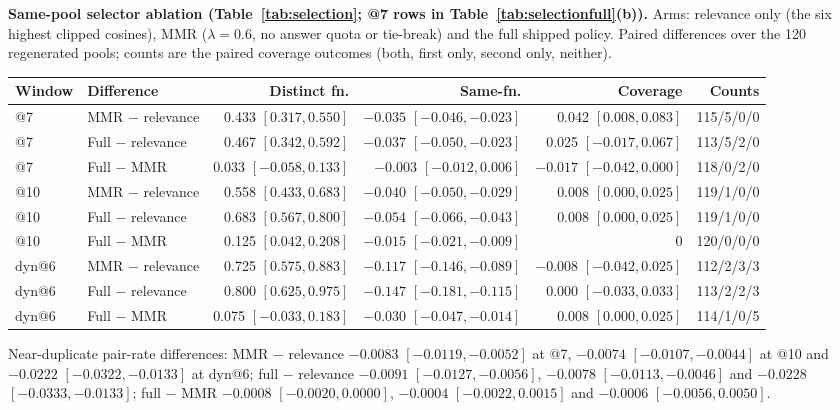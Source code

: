 \textbf{Same-pool selector ablation (Table~\ref{tab:selection}; @7 rows in Table~\ref{tab:selectionfull}(b)).} Arms: relevance only (the six highest clipped cosines), MMR ($\lambda=0.6$, no answer quota or tie-break) and the full shipped policy. Paired differences over the 120 regenerated pools; counts are the paired coverage outcomes (both, first only, second only, neither). %
\begin{center}\footnotesize
\setlength{\tabcolsep}{2.5pt}
\begin{tabular}{llrrrr}
\toprule
Window & Difference & Distinct fn. & Same-fn. & Coverage & Counts\\
\midrule
@7 & MMR $-$ relevance & 0.433 $[0.317,0.550]$ & $-0.035$ $[-0.046,-0.023]$ & 0.042 $[0.008,0.083]$ & 115/5/0/0\\
@7 & Full $-$ relevance & 0.467 $[0.342,0.592]$ & $-0.037$ $[-0.050,-0.023]$ & 0.025 $[-0.017,0.067]$ & 113/5/2/0\\
@7 & Full $-$ MMR & 0.033 $[-0.058,0.133]$ & $-0.003$ $[-0.012,0.006]$ & $-0.017$ $[-0.042,0.000]$ & 118/0/2/0\\
@10 & MMR $-$ relevance & 0.558 $[0.433,0.683]$ & $-0.040$ $[-0.050,-0.029]$ & 0.008 $[0.000,0.025]$ & 119/1/0/0\\
@10 & Full $-$ relevance & 0.683 $[0.567,0.800]$ & $-0.054$ $[-0.066,-0.043]$ & 0.008 $[0.000,0.025]$ & 119/1/0/0\\
@10 & Full $-$ MMR & 0.125 $[0.042,0.208]$ & $-0.015$ $[-0.021,-0.009]$ & 0 & 120/0/0/0\\
dyn@6 & MMR $-$ relevance & 0.725 $[0.575,0.883]$ & $-0.117$ $[-0.146,-0.089]$ & $-0.008$ $[-0.042,0.025]$ & 112/2/3/3\\
dyn@6 & Full $-$ relevance & 0.800 $[0.625,0.975]$ & $-0.147$ $[-0.181,-0.115]$ & 0.000 $[-0.033,0.033]$ & 113/2/2/3\\
dyn@6 & Full $-$ MMR & 0.075 $[-0.033,0.183]$ & $-0.030$ $[-0.047,-0.014]$ & 0.008 $[0.000,0.025]$ & 114/1/0/5\\
\bottomrule
\end{tabular}\end{center}
Near-duplicate pair-rate differences: MMR $-$ relevance $-0.0083$ $[-0.0119,-0.0052]$ at @7, $-0.0074$ $[-0.0107,-0.0044]$ at @10 and $-0.0222$ $[-0.0322,-0.0133]$ at dyn@6; full $-$ relevance $-0.0091$ $[-0.0127,-0.0056]$, $-0.0078$ $[-0.0113,-0.0046]$ and $-0.0228$ $[-0.0333,-0.0133]$; full $-$ MMR $-0.0008$ $[-0.0020,0.0000]$, $-0.0004$ $[-0.0022,0.0015]$ and $-0.0006$ $[-0.0056,0.0050]$. %
